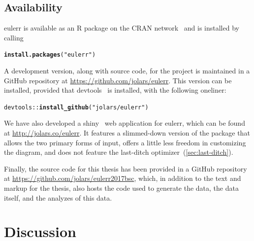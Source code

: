 \documentclass[
  oneside,
  openany,
  numbers=noendperiod,
  parskip=half,
  bibliography=totoc
]{scrbook}\usepackage[]{graphicx}\usepackage{xcolor}
\makeatletter
\newcommand{\hlstr}[1]{\textcolor[rgb]{0.192,0.494,0.8}{#1}}%
\newcommand{\hlopt}[1]{\textcolor[rgb]{0,0,0}{#1}}%
\newcommand{\hlstd}[1]{\textcolor[rgb]{0.345,0.345,0.345}{#1}}%
\newcommand{\hlkwd}[1]{\textcolor[rgb]{0.737,0.353,0.396}{\textbf{#1}}}%
\newenvironment{kframe}{%
 \def\at@end@of@kframe{}%
 \ifinner\ifhmode%
  \def\at@end@of@kframe{\end{minipage}}%
  \begin{minipage}{\columnwidth}%
 \fi\fi%
 \def\FrameCommand##1{\hskip\@totalleftmargin \hskip-\fboxsep
 \colorbox{shadecolor}{##1}\hskip-\fboxsep
     \hskip-\linewidth \hskip-\@totalleftmargin \hskip\columnwidth}%
 \MakeFramed {\advance\hsize-\width
   \@totalleftmargin\z@ \linewidth\hsize
   \@setminipage}}%
 {\par\unskip\endMakeFramed%
 \at@end@of@kframe}
\newenvironment{knitrout}{}{} %
\newcommand{\pkg}[1]{{\fontseries{b}\selectfont #1}}
\makeatother
\begin{document}
\section{Availability}\label{sec:availability}

\pkg{eulerr} is available as an R package on the CRAN network~\citep{RCT_2017a}
and is installed by calling

\begin{knitrout}\small
{}\color{fgcolor}\begin{kframe}
\begin{alltt}
\hlkwd{install.packages}\hlstd{(}\hlstr{"eulerr"}\hlstd{)}
\end{alltt}
\end{kframe}
\end{knitrout}

A development version, along with source code, for the project is maintained in
a GitHub repository at
\url{https://github.com/jolars/eulerr}. This version
can be installed, provided that \pkg{devtools}~\citep{Wickham_2017} is installed,
with the following oneliner:

\begin{knitrout}\small
{}\color{fgcolor}\begin{kframe}
\begin{alltt}
\hlstd{devtools}\hlopt{::}\hlkwd{install_github}\hlstd{(}\hlstr{"jolars/eulerr"}\hlstd{)}
\end{alltt}
\end{kframe}
\end{knitrout}

We have also developed a \pkg{shiny}~\citep{Chang_2017} web application for
\pkg{eulerr}, which can be found at \url{http://jolars.co/eulerr}. It features
a slimmed-down version of the package that
allows the two primary forms of input, offers a little less freedom in customizing the
diagram, and does not feature the last-ditch optimizer~(\cref{sec:last-ditch}).

Finally, the source code for this thesis has been provided in a GitHub
repository at
\url{https://github.com/jolars/eulerr2017bsc}, which, in addition to the
text and markup for the thesis, also hosts the code used to generate the
data, the data itself, and the analyzes of this data.

\chapter{Discussion}
\label{ch:discussion}
\end{document}
